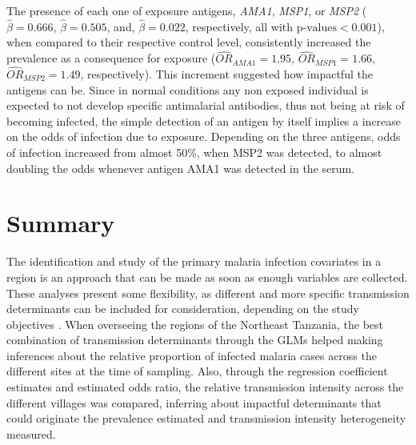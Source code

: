 The presence of each one of exposure antigens, \textit{AMA1}, \textit{MSP1}, or \textit{MSP2} ($\widehat{\beta}=0.666$, $\widehat{\beta}=0.505$, and, $\widehat{\beta}=0.022$, respectively, all with $\text{p-values}<0.001$), when compared to their respective control level, consistently increased the prevalence as a consequence for exposure ($\widehat{OR}_{AMA1}=1.95$, $\widehat{OR}_{MSP1}=1.66$, $\widehat{OR}_{MSP2}=1.49$, respectively).
This increment suggested how impactful the antigens can be.
Since in normal conditions any non exposed individual is expected to not develop specific antimalarial antibodies, thus not being at risk of becoming infected, the simple detection of an antigen by itself implies a increase on the odds of infection due to exposure.
Depending on the three antigens, odds of infection increased from almost 50\%, when MSP2 was detected, to almost doubling the odds whenever antigen AMA1 was detected in the serum.


\section{Summary}

The identification and study of the primary malaria infection covariates in a region is an approach that can be made as soon as enough variables are collected.
These analyses present some flexibility, as different and more specific transmission determinants can be included for consideration, depending on the study objectives \cite{binka1995risk}.
When overseeing the regions of the Northeast Tanzania, the best combination of transmission determinants through the GLMs helped making inferences about the relative proportion of infected malaria cases across the different sites at the time of sampling.
Also, through the regression coefficient estimates and estimated odds ratio, the relative transmission intensity across the different villages was compared, inferring about impactful determinants that could originate the prevalence estimated and transmission intensity heterogeneity measured.

